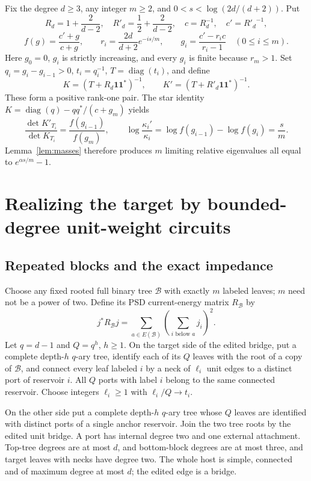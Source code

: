 \documentclass[11pt]{article}
\newcommand{\diag}{\operatorname{diag}}
\newcommand{\one}{\boldsymbol 1}
\begin{document}
Fix the degree $d\ge3$, any integer $m\ge2$, and
$0<s<\log(2d/(d+2))$. Put
\[
 R_d=1+\frac2{d-2},\quad R'_d=\frac12+\frac2{d-2},\quad
 c=R_d^{-1},\quad c'={R'_d}^{-1},
\]
\[
 f(g)=\frac{c'+g}{c+g},\qquad r_i=\frac{2d}{d+2}e^{-is/m},\qquad
 g_i=\frac{c'-r_ic}{r_i-1}\quad(0\le i\le m).
\]
Here $g_0=0$, $g_i$ is strictly increasing, and every $g_i$ is finite
because $r_m>1$. Set $q_i=g_i-g_{i-1}>0$, $t_i=q_i^{-1}$,
$T=\diag(t_i)$, and define
\begin{equation}\label{eq:target}
 K=(T+R_d\one\one^*)^{-1},\qquad
 K'=(T+R'_d\one\one^*)^{-1}.
\end{equation}
These form a positive rank-one pair. The star identity
$K=\diag(q)-qq^*/(c+g_m)$ yields
\[
 \frac{\det K'_{T_i}}{\det K_{T_i}}
         =\frac{f(g_{i-1})}{f(g_m)},\qquad
 \log\frac{\kappa_i'}{\kappa_i}
         =\log f(g_{i-1})-\log f(g_i)=\frac{s}{m}.
\]
Lemma~\ref{lem:masses} therefore produces $m$ limiting relative
eigenvalues all equal to $e^{\alpha s/m}-1$.

\section{Realizing the target by bounded-degree unit-weight circuits}
\subsection{Repeated blocks and the exact impedance}
Choose any fixed rooted full binary tree $\mathcal B$ with exactly
$m$ labeled leaves; $m$ need not be a power of two. Define its PSD
current-energy matrix $R_{\mathcal B}$ by
\[
 j^*R_{\mathcal B}j
   =\sum_{a\in E(\mathcal B)}\left(\sum_{i\text{ below }a}j_i\right)^2.
\]
Let $q=d-1$ and $Q=q^h$, $h\ge1$. On the target side of the edited bridge, put
a complete depth-$h$ $q$-ary tree, identify each of its $Q$ leaves with
the root of a copy of $\mathcal B$, and connect every leaf labeled $i$
by a neck of $\ell_i$ unit edges to a distinct port of reservoir $i$.
All $Q$ ports with label $i$ belong to the same connected reservoir.
Choose integers $\ell_i\ge1$ with $\ell_i/Q\to t_i$.

On the other side put a complete depth-$h$ $q$-ary tree whose $Q$ leaves
are identified with distinct ports of a single anchor reservoir.
Join the two tree roots by the edited unit bridge. A port has internal
degree two and one external attachment. Top-tree degrees are at most $d$,
and bottom-block degrees are at most three,
and target leaves with necks have degree two. The whole host is simple,
connected and of maximum degree at most $d$; the edited edge is a bridge.
\end{document}
